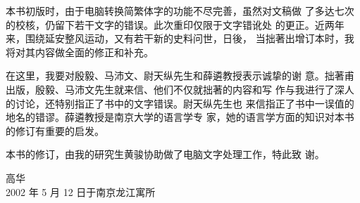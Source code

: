 \begin{fzliukai}
本书初版时，由于电脑转换简繁体字的功能不尽完善，虽然对文稿做
了多达七次的校核，仍留下若干文字的错误。此次重印仅限于文字错讹处
的更正。近两年来，围绕延安整风运动，又有若干新的史料问世，日後，
当拙著出增订本时，我将对其内容做全面的修正和补充。

在这里，我要对殷毅、马沛文、尉天纵先生和薛遴教授表示诚挚的谢
意。拙著甫出版，殷毅、马沛文先生就来信、他们不仅就拙著的内容和写
作与我进行了深人的讨论，还特别指正了书中的文字错误。尉天纵先生也
来信指正了书中一误值的地名的错谬。薛遴教授是南京大学的语言学专
家，她的语言学方面的知识对本书的修订有重要的启发。

本书的修订，由我的研究生黄骏协助做了电脑文字处理工作，特此致
谢。

\bigskip\mbox{}\large\hfill  高华\qquad \qquad \qquad\\
\bigskip\mbox{}\large\hfill
2002 年 5 月 12 日于南京龙江寓所
\end{fzliukai}
\cleardoublepage

\tableofcontents
